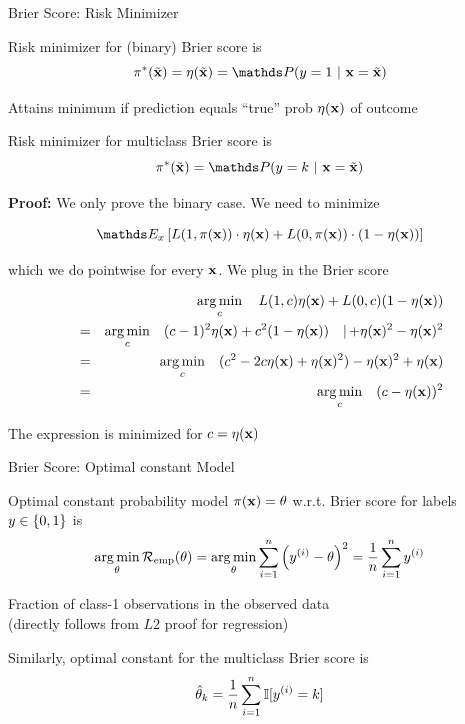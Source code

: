 \documentclass[11pt,compress,t,notes=noshow, xcolor=table]{beamer}
\begin{document}
\begin{vbframe}{Brier Score: Risk Minimizer}

\begin{itemizeL}
    \item Risk minimizer for (binary) Brier score is $$\piastxtil = \eta(\xtil) = \P(y=1~|~\xv = \xtil)$$
    \item Attains minimum if prediction equals \enquote{true} prob $\eta(\mathbf{x})$ of outcome
    \item Risk minimizer for multiclass Brier score is 
$$\piastxtil = \P(y = k ~|~ \xv = \xtil) $$
\end{itemizeL}
 
\framebreak
\textbf{Proof: } We only prove the binary case. We need to minimize 

$$
\E_x \left[L(1, \pix) \cdot \eta(\xv) + L(0, \pix) \cdot (1 - \eta(\xv)) \right]
$$

which we do pointwise for every $\mathbf{x}$. We plug in the Brier score

\vspace*{-0.3cm}

\begin{eqnarray*}
	&& \mathop{\mathrm{arg\,min}}_c \quad L(1, c) \eta(\mathbf{x}) + L(0, c) (1 - \eta(\mathbf{x})) \\ 
	&=&  \mathop{\mathrm{arg\,min}}_c \quad (c - 1)^2 \eta(\mathbf{x}) + c^2 (1 - \eta(\mathbf{x}))  \quad |{\,+\eta(\mathbf{x})^2-\eta(\mathbf{x})^2}\\
  &=&  \mathop{\mathrm{arg\,min}}_c \quad (c^2 -2c\eta(\mathbf{x}) + \eta(\mathbf{x})^2)- \eta(\mathbf{x})^2 + \eta(\mathbf{x}) \\
	&=&  \mathop{\mathrm{arg\,min}}_c \quad (c - \eta(\mathbf{x}))^2
\end{eqnarray*}

The expression is minimized for $c = \eta(\mathbf{x})$

\end{vbframe}

\begin{vbframe}{Brier Score: Optimal constant Model}

\begin{itemizeL}
    \item Optimal constant probability model $\pi(\mathbf{x}) = \theta$ w.r.t. Brier score for labels $y \in  \{0, 1\}$ is $$\mathop{\mathrm{arg\,min}}_{\theta} \mathcal{R}_{\text{emp}}(\theta) = \mathop{\mathrm{arg\,min}}_{\theta} \sum\limits_{i=1}^n \left(y^{(i)} - \theta\right)^2 = \frac{1}{n} \sum\limits_{i=1}^n y^{(i)}$$
    \item Fraction of class-1 observations in the observed data\\ (directly follows from $L2$ proof for regression)
    \item Similarly, optimal constant for the multiclass Brier score is $$\hat{\theta}_k = \frac{1}{n}\sum\limits_{i=1}^n \mathbb{I} [y^{(i)} = k]$$
\end{itemizeL}


\end{vbframe}
\end{document}
